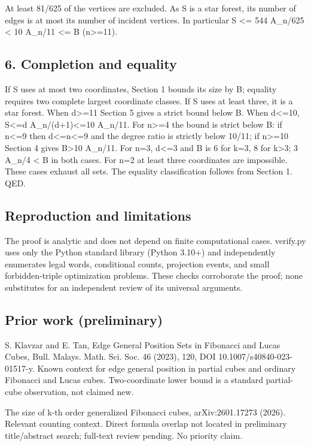 \documentclass[
  11pt,
]{article}
\begin{document}
At least 81/625 of the vertices are excluded. As S is a star forest, its
number of edges is at most its number of incident vertices. In
particular \textbar S\textbar{} \textless= 544 A\_n/625 \textless{} 10
A\_n/11 \textless= B (n\textgreater=11).

\subsection{6. Completion and equality}\label{6-completion-and-equality}

If S uses at most two coordinates, Section 1 bounds its size by B;
equality requires two complete largest coordinate classes. If S uses at
least three, it is a star forest. When d\textgreater=11 Section 5 gives
a strict bound below B. When d\textless=10,
\textbar S\textbar\textless=d A\_n/(d+1)\textless=10 A\_n/11. For
n\textgreater=4 the bound is strict below B: if n\textless=9 then
d\textless=n\textless=9 and the degree ratio is strictly below 10/11; if
n\textgreater=10 Section 4 gives B\textgreater10 A\_n/11. For n=3,
d\textless=3 and B is 6 for k=3, 8 for k\textgreater3; 3 A\_n/4
\textless{} B in both cases. For n=2 at least three coordinates are
impossible. These cases exhaust all sets. The equality classification
follows from Section 1. QED.

\subsection{Reproduction and
limitations}\label{reproduction-and-limitations}

The proof is analytic and does not depend on finite computational cases.
verify.py uses only the Python standard library (Python 3.10+) and
independently enumerates legal words, conditional counts, projection
events, and small forbidden-triple optimization problems. These checks
corroborate the proof; none substitutes for an independent review of its
universal arguments.

\subsection{Prior work (preliminary)}\label{prior-work-preliminary}

S. Klavzar and E. Tan, Edge General Position Sets in Fibonacci and Lucas
Cubes, Bull. Malays. Math. Sci. Soc. 46 (2023), 120, DOI
10.1007/s40840-023-01517-y. Known context for edge general position in
partial cubes and ordinary Fibonacci and Lucas cubes. Two-coordinate
lower bound is a standard partial-cube observation, not claimed new.

The size of k-th order generalized Fibonacci cubes, arXiv:2601.17273
(2026). Relevant counting context. Direct formula overlap not located in
preliminary title/abstract search; full-text review pending. No priority
claim.
\end{document}
